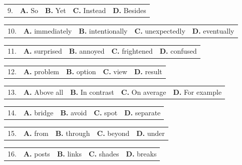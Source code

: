 \documentclass[UTF8,11pt]{ctexart}
\begin{document}
\noindent\begin{tabularx}{\linewidth}{@{}lXXXX@{}}9. & \textbf{A.} So & \textbf{B.} Yet & \textbf{C.} Instead & \textbf{D.} Besides\\\end{tabularx}\par

\noindent\begin{tabularx}{\linewidth}{@{}lXXXX@{}}10. & \textbf{A.} immediately & \textbf{B.} intentionally & \textbf{C.} unexpectedly & \textbf{D.} eventually\\\end{tabularx}\par

\noindent\begin{tabularx}{\linewidth}{@{}lXXXX@{}}11. & \textbf{A.} surprised & \textbf{B.} annoyed & \textbf{C.} frightened & \textbf{D.} confused\\\end{tabularx}\par

\noindent\begin{tabularx}{\linewidth}{@{}lXXXX@{}}12. & \textbf{A.} problem & \textbf{B.} option & \textbf{C.} view & \textbf{D.} result\\\end{tabularx}\par

\noindent\begin{tabularx}{\linewidth}{@{}lXXXX@{}}13. & \textbf{A.} Above all & \textbf{B.} In contrast & \textbf{C.} On average & \textbf{D.} For example\\\end{tabularx}\par

\noindent\begin{tabularx}{\linewidth}{@{}lXXXX@{}}14. & \textbf{A.} bridge & \textbf{B.} avoid & \textbf{C.} spot & \textbf{D.} separate\\\end{tabularx}\par

\noindent\begin{tabularx}{\linewidth}{@{}lXXXX@{}}15. & \textbf{A.} from & \textbf{B.} through & \textbf{C.} beyond & \textbf{D.} under\\\end{tabularx}\par

\noindent\begin{tabularx}{\linewidth}{@{}lXXXX@{}}16. & \textbf{A.} posts & \textbf{B.} links & \textbf{C.} shades & \textbf{D.} breaks\\\end{tabularx}\par
\end{document}
